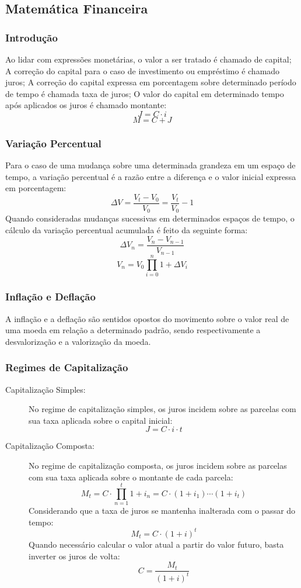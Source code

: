 \subsection{Matemática Financeira}
    \subsubsection{Introdução}
        Ao lidar com expressões monetárias, o valor a ser tratado é chamado de capital; A correção do capital para o caso de investimento ou empréstimo é chamado juros; A correção do capital expressa em porcentagem sobre determinado período de tempo é chamada taxa de juros; O valor do capital em determinado tempo após aplicados os juros é chamado montante:
        \[ J = C \cdot i \]
        \[ M = C + J \]
    \subsubsection{Variação Percentual}
        Para o caso de uma mudança sobre uma determinada grandeza em um espaço de tempo, a variação percentual é a razão entre a diferença e o valor inicial expressa em porcentagem:
        \[ \Delta V = \frac{V_t - V_0}{V_0} = \frac{V_t}{V_0} - 1 \]
        Quando consideradas mudanças sucessivas em determinados espaços de tempo, o cálculo da variação percentual acumulada é feito da seguinte forma:
        \[ \Delta V_n = \frac{V_n - V_{n-1}}{V_{n-1}} \]
        \[ V_n = V_0 \displaystyle\prod_{i=0}^{n} {1 + \Delta V_i} \]
    \subsubsection{Inflação e Deflação}
        A inflação e a deflação são sentidos opostos do movimento sobre o valor real de uma moeda em relação a determinado padrão, sendo respectivamente a desvalorização e a valorização da moeda.
    \subsubsection{Regimes de Capitalização}
        \begin{description}
            \item[Capitalização Simples:]
                No regime de capitalização simples, os juros incidem sobre as parcelas com sua taxa aplicada sobre o capital inicial:
                \[ J = C \cdot i \cdot t \]
            \item[Capitalização Composta:]
                No regime de capitalização composta, os juros incidem sobre as parcelas com sua taxa aplicada sobre o montante de cada parcela:
                \[ M_t = C \cdot \displaystyle\prod_{n=1}^{t} {1 + i_n} = C \cdot (1 + i_1) \cdots (1 + i_t) \]
                Considerando que a taxa de juros se mantenha inalterada com o passar do tempo:
                \[ M_t = C \cdot (1+i)^t \]
                Quando necessário calcular o valor atual a partir do valor futuro, basta inverter os juros de volta:
                \[ C = \frac{M_t}{(1+i)^t} \]
        \end{description}
